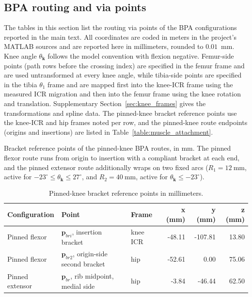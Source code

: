 \documentclass[utf8]{frontiers_suppmat} %
\begin{document}
\clearpage

\subsection{BPA routing and via points}

The tables in this section list the routing via points of the BPA configurations reported in the main text. All coordinates are coded in meters in the project's MATLAB sources and are reported here in millimeters, rounded to $0.01$~mm. Knee angle $\theta_{\mathbf{k}}$ follows the model convention with flexion negative. Femur-side points (path rows before the crossing index) are specified in the femur frame and are used untransformed at every knee angle, while tibia-side points are specified in the tibia $\theta_{1}$ frame and are mapped first into the knee-ICR frame using the measured ICR migration and then into the femur frame using the knee rotation and translation. Supplementary Section~\ref{sec:knee_frames} gives the transformations and spline data. The pinned-knee bracket reference points use the knee-ICR and hip frames noted per row, and the pinned-knee route endpoints (origins and insertions) are listed in Table~\ref{table:muscle_attachment}.

Bracket reference points of the pinned-knee BPA routes, in mm. The pinned flexor route runs from origin to insertion with a compliant bracket at each end, and the pinned extensor route additionally wraps on two fixed arcs ($R_{1} = \qty{12}{\milli\metre}$, active for $-23^{\circ} \leq \theta_{\mathbf{k}} \leq 27^{\circ}$, and $R_{2} = \qty{40}{\milli\metre}$, active for $\theta_{\mathbf{k}} \leq -23^{\circ}$).

\begin{table}[htbp]
\caption{Pinned-knee bracket reference points in millimeters.}
\label{tab:RoutePinnedBrackets}
\centering
\small
\begin{tabular}{lllrrr}
\toprule
\textbf{Configuration} & \textbf{Point} & \textbf{Frame} & \textbf{x (mm)} & \textbf{y (mm)} & \textbf{z (mm)} \\
\midrule
Pinned flexor & $\mathbf{p}_{bri}$, insertion bracket & knee ICR & -48.11 & -107.81 & 13.80 \\
Pinned flexor & $\mathbf{p}_{br2}$, origin-side second bracket & hip & -52.61 & 0.00 & 75.06 \\
Pinned extensor & $\mathbf{p}_{br}$, rib midpoint, medial side & hip & -3.84 & -46.44 & 62.50 \\
\bottomrule
\end{tabular}
\end{table}
\end{document}
